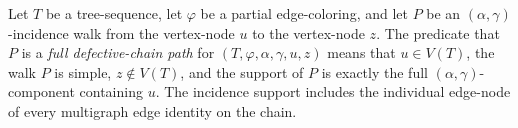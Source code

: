 \begin{definition}
Let $T$ be a tree-sequence, let $\varphi$ be a partial edge-coloring, and
let $P$ be an $(\alpha,\gamma)$-incidence walk from the vertex-node $u$ to
the vertex-node $z$.  The predicate that $P$ is a \emph{full
defective-chain path} for $(T,\varphi,\alpha,\gamma,u,z)$ means that
$u\in V(T)$, the walk $P$ is simple, $z\notin V(T)$, and the support of
$P$ is exactly the full $(\alpha,\gamma)$-component containing $u$.  The
incidence support includes the individual edge-node of every multigraph
edge identity on the chain.
\end{definition}
